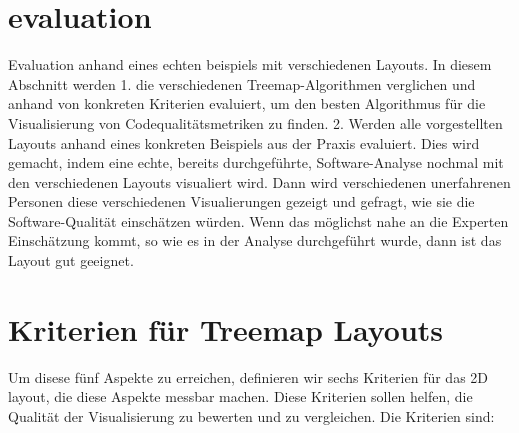\section{evaluation} \label{sec:Evaluation}

Evaluation anhand eines echten beispiels mit verschiedenen Layouts.
In diesem Abschnitt werden 1. die verschiedenen Treemap-Algorithmen verglichen und anhand von konkreten Kriterien evaluiert, um den besten Algorithmus für die Visualisierung von Codequalitätsmetriken zu finden. 2. Werden alle vorgestellten Layouts anhand eines konkreten Beispiels aus der Praxis evaluiert.
Dies wird gemacht, indem eine echte, bereits durchgeführte, Software-Analyse nochmal mit den verschiedenen Layouts visualiert wird. Dann wird verschiedenen unerfahrenen Personen diese verschiedenen Visualierungen gezeigt und gefragt, wie sie die Software-Qualität einschätzen würden. Wenn das möglichst nahe an die Experten Einschätzung kommt, so wie es in der Analyse durchgeführt wurde, dann ist das Layout gut geeignet. 

\section{Kriterien für Treemap Layouts} \label{sec:CodeCityLayouts}
Um disese fünf Aspekte zu erreichen, definieren wir sechs Kriterien für das 2D layout, die diese Aspekte messbar machen. Diese Kriterien sollen helfen, die Qualität der Visualisierung zu bewerten und zu vergleichen. Die Kriterien sind:

